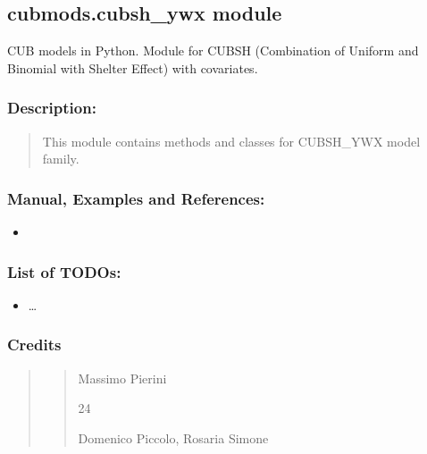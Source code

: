 \documentclass[letterpaper,10pt,english]{sphinxmanual}
\begin{document}
\subsection{cubmods.cubsh\_ywx module}
\label{\detokenize{cubmods:module-cubmods.cubsh_ywx}}\label{\detokenize{cubmods:cubmods-cubsh-ywx-module}}\label{\detokenize{cubmods:cubshywx-module}}
\sphinxAtStartPar
CUB models in Python.
Module for CUBSH (Combination of Uniform
and Binomial with Shelter Effect) with covariates.


\subsubsection{Description:}
\label{\detokenize{cubmods:id38}}\begin{quote}

\sphinxAtStartPar
This module contains methods and classes
for CUBSH\_YWX model family.
\end{quote}


\subsubsection{Manual, Examples and References:}
\label{\detokenize{cubmods:id39}}\begin{itemize}
\item {} 
\sphinxAtStartPar
{}

\end{itemize}


\subsubsection{List of TODOs:}
\label{\detokenize{cubmods:id40}}\begin{itemize}
\item {} 
\sphinxAtStartPar
…

\end{itemize}


\subsubsection{Credits}
\label{\detokenize{cubmods:id41}}\begin{quote}
\begin{quote}\begin{description}
\sphinxAtStartPar
Massimo Pierini

\sphinxhyphen{}24

\sphinxAtStartPar
Domenico Piccolo, Rosaria Simone

\sphinxAtStartPar
{}

\end{description}\end{quote}
\end{quote}
\end{document}
